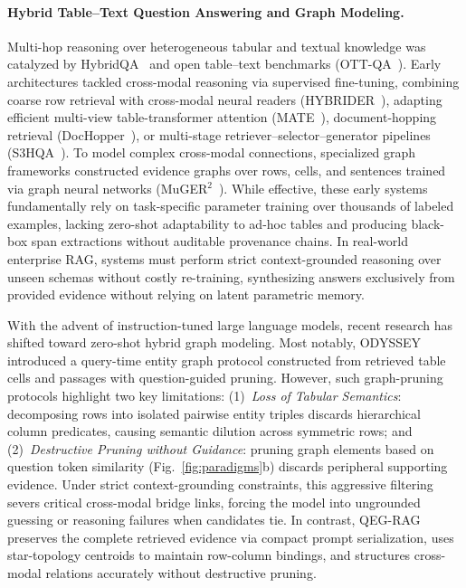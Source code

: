 \documentclass[runningheads]{llncs}
\begin{document}
\paragraph{Hybrid Table--Text Question Answering and Graph Modeling.}
Multi-hop reasoning over heterogeneous tabular and textual knowledge was catalyzed by HybridQA~\cite{hybridqa} and open table--text benchmarks (OTT-QA~\cite{chen2021ottqa}). Early architectures tackled cross-modal reasoning via supervised fine-tuning, combining coarse row retrieval with cross-modal neural readers (HYBRIDER~\cite{hybridqa}), adapting efficient multi-view table-transformer attention (MATE~\cite{eisenschlos2021mate}), document-hopping retrieval (DocHopper~\cite{sun2021dochopper}), or multi-stage retriever--selector--generator pipelines (S3HQA~\cite{lei2023s3hqa}). To model complex cross-modal connections, specialized graph frameworks constructed evidence graphs over rows, cells, and sentences trained via graph neural networks (MuGER$^2$~\cite{wang2022muger2}). While effective, these early systems fundamentally rely on task-specific parameter training over thousands of labeled examples, lacking zero-shot adaptability to ad-hoc tables and producing black-box span extractions without auditable provenance chains. In real-world enterprise RAG, systems must perform strict context-grounded reasoning over unseen schemas without costly re-training, synthesizing answers exclusively from provided evidence without relying on latent parametric memory.

With the advent of instruction-tuned large language models, recent research has shifted toward zero-shot hybrid graph modeling. Most notably, ODYSSEY~\cite{agarwal2025hybrid} introduced a query-time entity graph protocol constructed from retrieved table cells and passages with question-guided pruning. However, such graph-pruning protocols highlight two key limitations: (1)~\emph{Loss of Tabular Semantics}: decomposing rows into isolated pairwise entity triples discards hierarchical column predicates, causing semantic dilution across symmetric rows; and (2)~\emph{Destructive Pruning without Guidance}: pruning graph elements based on question token similarity (Fig.~\ref{fig:paradigms}b) discards peripheral supporting evidence. Under strict context-grounding constraints, this aggressive filtering severs critical cross-modal bridge links, forcing the model into ungrounded guessing or reasoning failures when candidates tie. In contrast, QEG-RAG preserves the complete retrieved evidence via compact prompt serialization, uses star-topology centroids to maintain row-column bindings, and structures cross-modal relations accurately without destructive pruning.
\end{document}
